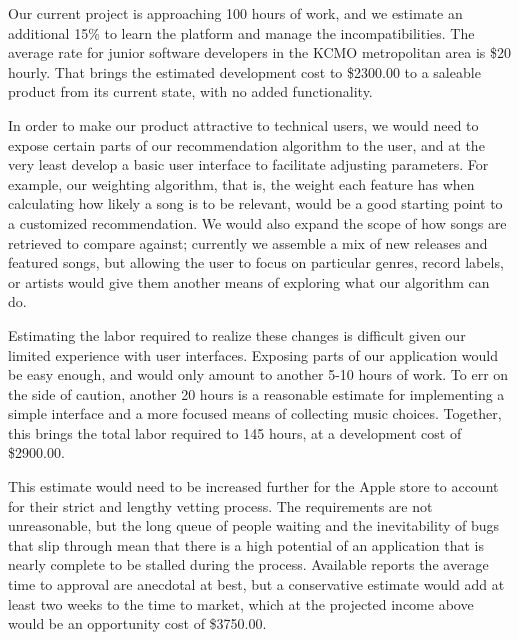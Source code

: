 \documentclass{roffin}
\begin{document}
Our current project is approaching 100 hours of work, and we estimate an additional 15\% to learn the platform and manage the incompatibilities.  The average rate for junior software developers in the KCMO metropolitan area is \$20 hourly.  That brings the estimated development cost to \$2300.00 to a saleable product from its current state, with no added functionality.

In order to make our product attractive to technical users, we would need to expose certain parts of our recommendation algorithm to the user, and at the very least develop a basic user interface to facilitate adjusting parameters.  For example, our weighting algorithm, that is, the weight each feature has when calculating how likely a song is to be relevant, would be a good starting point to a customized recommendation.  We would also expand the scope of how songs are retrieved to compare against;  currently we assemble a mix of new releases and featured songs, but allowing the user to focus on particular genres, record labels, or artists would give them another means of exploring what our algorithm can do.

Estimating the labor required to realize these changes is difficult given our limited experience with user interfaces.  Exposing parts of our application would be easy enough, and would only amount to another 5-10 hours of work.  To err on the side of caution, another 20 hours is a reasonable estimate for implementing a simple interface and a more focused means of collecting music choices.  Together, this brings the total labor required to 145 hours, at a development cost of \$2900.00.

This estimate would need to be increased further for the Apple store to account for their strict and lengthy vetting process.  The requirements are not unreasonable, but the long queue of people waiting and the inevitability of bugs that slip through mean that there is a high potential of an application that is nearly complete to be stalled during the process.  Available reports the average time to approval are anecdotal at best, but a conservative estimate would add at least two weeks to the time to market, which at the projected income above would be an opportunity cost of \$3750.00.
\end{document}

